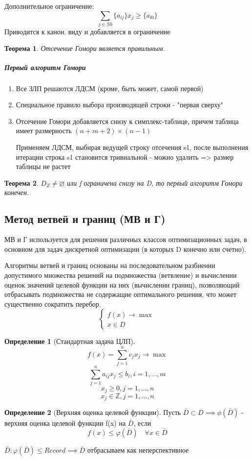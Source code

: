 \documentclass[a4paper]{article}
\newtheorem{theorem}{Теорема}[section]
\theoremstyle{definition}
\newtheorem*{definition}{Определение}
\theoremstyle{remark}
\begin{document}
Дополнительное ограничение:
\[\sum_{j\in Nb} \{a_{lj}\}x_j \geq \{a_{l0}\}\]
Приводится к канон. виду и добавляется в ограничение
\begin{theorem}
    Отсечение Гомори является правильным.
\end{theorem}
\subparagraph*{Первый алгоритм Гомори}
\begin{enumerate}
    \item Все ЗЛП решаются ЛДСМ (кроме, быть может, самой первой)
    \item Специальное правило выбора производящей строки - "первая сверху"
    \item Отсечение Гомори добавляется снизу к симплекс-таблице, причем таблица имеет размерность $(n+m+2)\times(n-1)$
    
    Применяем ЛДСМ, выбирая ведущей строку отсечения s1, после выполнения итерации строка s1 становится тривиальной - можно удалить => размер таблицы не растет
\end{enumerate}
\begin{theorem}
    $D_Z\neq \varnothing$ или f ограничена снизу на D, то первый алгоритм Гомори конечен.
\end{theorem}
\subsection{Метод ветвей и границ (МВ и Г)}
МВ и Г используется для решения различных классов оптимизационных задач, в основном для задач дискретной оптимизации (в которых D конечно или счетно).

Алгоритмы ветвей и границ основаны на последовательном разбиении допустимого множества решений на подмножества (ветвление) и вычислении оценок значений целевой функции на них (вычислении границ), позволяющий отбрасывать подмножества не содержащие оптимального решения, что может существенно сократить перебор.
\[\begin{cases}
    f(x) \to \max \\
    x\in D
\end{cases}\]
\begin{definition}[Стандартная задача ЦЛП]
    \begin{equation}
        f(x) = \sum_{j=1}^n c_j x_j \to \max
    \end{equation}
 \begin{equation}
    \sum_{j = 1}^n a_{ij}x_j \le b_i, i = 1, \dots, m 
 \end{equation}
\begin{equation}
    x_j \ge 0, j = 1, \dots, n
\end{equation}
 \begin{equation}
    x_j \in \mathbb{Z}, j =1, \dots, n 
 \end{equation}

\end{definition}
\begin{definition}[Верхняя оценка целевой функции]
    Пусть $\bar{D} \subset D \implies \phi(\bar{D})$ - верхняя оценка целевой функции f(x) на $\bar{D}$, если \[f(x)\le \varphi(\bar{D}) \quad \forall x \in \bar{D}\]
\end{definition}
$\bar{D}: \varphi(\bar{D}) \le Record \implies \bar{D}$ отбрасываем как неперспективное
\end{document}
